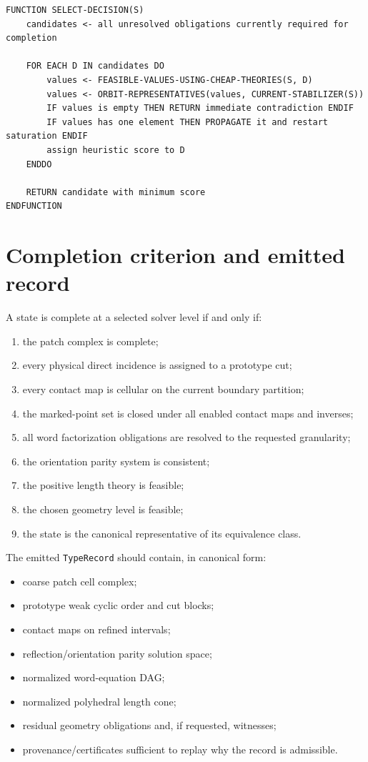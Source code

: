 \documentclass[11pt]{article}
\begin{document}
\begin{lstlisting}[caption={Decision selection contract.}]
FUNCTION SELECT-DECISION(S)
    candidates <- all unresolved obligations currently required for completion

    FOR EACH D IN candidates DO
        values <- FEASIBLE-VALUES-USING-CHEAP-THEORIES(S, D)
        values <- ORBIT-REPRESENTATIVES(values, CURRENT-STABILIZER(S))
        IF values is empty THEN RETURN immediate contradiction ENDIF
        IF values has one element THEN PROPAGATE it and restart saturation ENDIF
        assign heuristic score to D
    ENDDO

    RETURN candidate with minimum score
ENDFUNCTION
\end{lstlisting}

\section{Completion criterion and emitted record}

A state is complete at a selected solver level if and only if:
\begin{enumerate}
  \item the patch complex is complete;
  \item every physical direct incidence is assigned to a prototype cut;
  \item every contact map is cellular on the current boundary partition;
  \item the marked-point set is closed under all enabled contact maps and inverses;
  \item all word factorization obligations are resolved to the requested granularity;
  \item the orientation parity system is consistent;
  \item the positive length theory is feasible;
  \item the chosen geometry level is feasible;
  \item the state is the canonical representative of its equivalence class.
\end{enumerate}

The emitted \texttt{TypeRecord} should contain, in canonical form:
\begin{itemize}
  \item coarse patch cell complex;
  \item prototype weak cyclic order and cut blocks;
  \item contact maps on refined intervals;
  \item reflection/orientation parity solution space;
  \item normalized word-equation DAG;
  \item normalized polyhedral length cone;
  \item residual geometry obligations and, if requested, witnesses;
  \item provenance/certificates sufficient to replay why the record is admissible.
\end{itemize}
\end{document}
